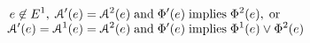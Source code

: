 \begin{itemize}
\begin{gather*}
\begin{aligned}
        \\[-1ex]
        e \not\in E^1,\; \mathcal{A}'(e) &= \mathcal{A}^2(e) \;\allowbreak\text{and}\allowbreak\; \Phi'(e) \; \allowbreak\text{implies}\allowbreak\; \Phi^2(e),\; \allowbreak\text{or}\allowbreak\;
        \\[-1ex]
        \mathcal{A}'(e) = \mathcal{A}^1(e) &= \mathcal{A}^2(e) \;\allowbreak\text{and}\allowbreak\; \Phi'(e) \; \allowbreak\text{implies}\allowbreak\; \Phi^1(e) \lor \Phi^2(e)
      \end{aligned}
    \end{gather*}
  \end{itemize}

